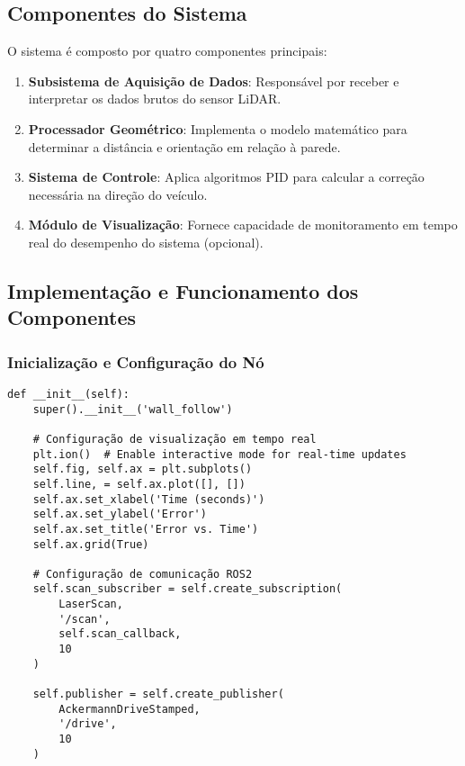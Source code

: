 \subsection{Componentes do Sistema}

O sistema é composto por quatro componentes principais:

\begin{enumerate}
    \item \textbf{Subsistema de Aquisição de Dados}: Responsável por receber e interpretar os dados brutos do sensor LiDAR.
    \item \textbf{Processador Geométrico}: Implementa o modelo matemático para determinar a distância e orientação em relação à parede.
    \item \textbf{Sistema de Controle}: Aplica algoritmos PID para calcular a correção necessária na direção do veículo.
    \item \textbf{Módulo de Visualização}: Fornece capacidade de monitoramento em tempo real do desempenho do sistema (opcional).
\end{enumerate}

\subsection{Implementação e Funcionamento dos Componentes}

\subsubsection{Inicialização e Configuração do Nó}

\begin{verbatim}
def __init__(self):
    super().__init__('wall_follow')

    # Configuração de visualização em tempo real
    plt.ion()  # Enable interactive mode for real-time updates
    self.fig, self.ax = plt.subplots()
    self.line, = self.ax.plot([], [])
    self.ax.set_xlabel('Time (seconds)')
    self.ax.set_ylabel('Error')
    self.ax.set_title('Error vs. Time')
    self.ax.grid(True)

    # Configuração de comunicação ROS2
    self.scan_subscriber = self.create_subscription(
        LaserScan,
        '/scan',
        self.scan_callback,
        10
    )

    self.publisher = self.create_publisher(
        AckermannDriveStamped,
        '/drive',
        10
    )
\end{verbatim}

